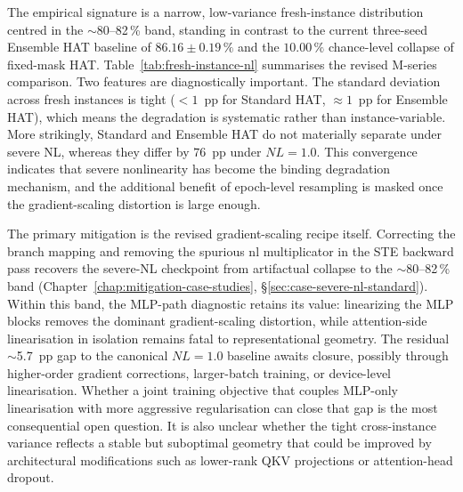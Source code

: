 The empirical signature is a narrow, low-variance fresh-instance distribution centred in the $\sim$80--82\,\% band, standing in contrast to the current three-seed Ensemble HAT baseline of $86.16\pm0.19\,\%$ and the $10.00\,\%$ chance-level collapse of fixed-mask HAT.  Table~\ref{tab:fresh-instance-nl} summarises the revised M-series comparison.  Two features are diagnostically important.  The standard deviation across fresh instances is tight ($<1$~pp for Standard HAT, $\approx 1$~pp for Ensemble HAT), which means the degradation is systematic rather than instance-variable.  More strikingly, Standard and Ensemble HAT do not materially separate under severe NL, whereas they differ by $76$~pp under $NL=1.0$.  This convergence indicates that severe nonlinearity has become the binding degradation mechanism, and the additional benefit of epoch-level resampling is masked once the gradient-scaling distortion is large enough.

\begin{table}[ht]
    \centering
    \caption{Severe-NL fresh-instance transfer under the revised gradient-scaling recipe.}
    \label{tab:fresh-instance-nl}
    \small
    \setlength{\tabcolsep}{5pt}
\end{table}

The primary mitigation is the revised gradient-scaling recipe itself.  Correcting the branch mapping and removing the spurious nl multiplicator in the STE backward pass recovers the severe-NL checkpoint from artifactual collapse to the $\sim$80--82\,\% band (Chapter~\ref{chap:mitigation-case-studies}, \S\ref{sec:case-severe-nl-standard}).  Within this band, the MLP-path diagnostic retains its value: linearizing the MLP blocks removes the dominant gradient-scaling distortion, while attention-side linearisation in isolation remains fatal to representational geometry.  The residual $\sim$5.7~pp gap to the canonical $NL=1.0$ baseline awaits closure, possibly through higher-order gradient corrections, larger-batch training, or device-level linearisation.  Whether a joint training objective that couples MLP-only linearisation with more aggressive regularisation can close that gap is the most consequential open question.  It is also unclear whether the tight cross-instance variance reflects a stable but suboptimal geometry that could be improved by architectural modifications such as lower-rank QKV projections or attention-head dropout.


